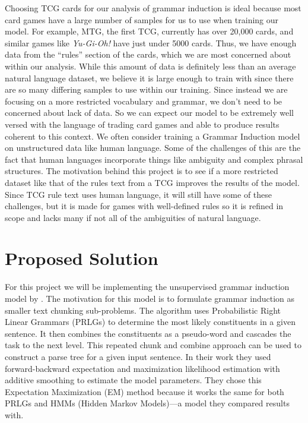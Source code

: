 \documentclass[11pt,a4paper]{article}
\begin{document}
Choosing TCG cards for our analysis of grammar induction is ideal because most card games have a large number of samples for us to use when training our model.
For example, MTG, the first TCG, currently has over 20,000 cards, and similar games like \emph{Yu-Gi-Oh!} have just under 5000 cards.
Thus, we have enough data from the “rules” section of the cards, which we are most concerned about within our analysis.
While this amount of data is definitely less than an average natural language dataset, we believe it is large enough to train with since there are so many differing samples to use within our training.
Since instead we are focusing on a more restricted vocabulary and grammar, we don’t need to be concerned about lack of data.
So we can expect our model to be extremely well versed with the language of trading card games and able to produce results coherent to this context.
We often consider training a Grammar Induction model on unstructured data like human language.
Some of the challenges of this are the fact that human languages incorporate things like ambiguity and complex phrasal structures.
The motivation behind this project is to see if a more restricted dataset like that of the rules text from a TCG improves the results of the model.
Since TCG rule text uses human language, it will still have some of these challenges, but it is made for games with well-defined rules so it is refined in scope and lacks many if not all of the ambiguities of natural language.

\section{Proposed Solution}

For this project we will be implementing the unsupervised grammar induction model by \citet{ponvert-etal-2011-simple}.
The motivation for this model is to formulate grammar induction as smaller text chunking sub-problems.
The algorithm uses Probabilistic Right Linear Grammars (PRLGs) to determine the most likely constituents in a given sentence.
It then combines the constituents as a pseudo-word and cascades the task to the next level.
This repeated chunk and combine approach can be used to construct a parse tree for a given input sentence.
In their work they used forward-backward expectation and maximization likelihood estimation with additive smoothing to estimate the model parameters.
They chose this Expectation Maximization (EM) method because it works the same for both PRLGs and HMMs (Hidden Markov Models)—a model they compared results with.
\end{document}

